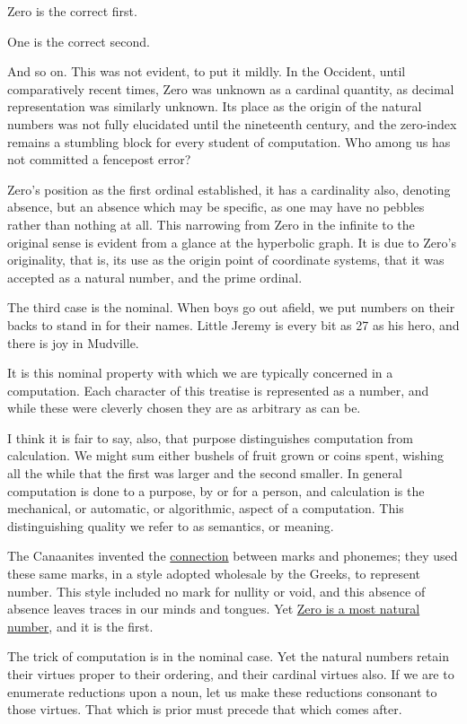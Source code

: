 \documentclass[twoside]{article}
\begin{document}
Zero is the correct first.

One is the correct second.

And so on. This was not evident, to put it mildly. In the Occident, until comparatively recent times, Zero was unknown as a cardinal quantity, as decimal representation was similarly unknown. Its place as the origin of the natural numbers was not fully elucidated until the nineteenth century, and the zero-index remains a stumbling block for every student of computation. Who among us has not committed a fencepost error?

Zero's position as the first ordinal established, it has a cardinality also, denoting absence, but an absence which may be specific, as one may have no pebbles rather than nothing at all. This narrowing from Zero in the infinite to the original sense is evident from a glance at the hyperbolic graph. It is due to Zero's originality, that is, its use as the origin point of coordinate systems, that it was accepted as a natural number, and the prime ordinal.

The third case is the nominal. When boys go out afield, we put numbers on their backs to stand in for their names. Little Jeremy is every bit as 27 as his hero, and there is joy in Mudville.

It is this nominal property with which we are typically concerned in a computation. Each character of this treatise is represented as a number, and while these were cleverly chosen they are as arbitrary as can be.

I think it is fair to say, also, that purpose distinguishes computation from calculation. We might sum either bushels of fruit grown or coins spent, wishing all the while that the first was larger and the second smaller. In general computation is done to a purpose, by or for a person, and calculation is the mechanical, or automatic, or algorithmic, aspect of a computation. This distinguishing quality we refer to as semantics, or meaning.

The Canaanites invented the \href{https://en.wikipedia.org/wiki/Alphabet}{connection} between marks and phonemes; they used these same marks, in a style adopted wholesale by the Greeks, to represent number. This style included no mark for nullity or void, and this absence of absence leaves traces in our minds and tongues. Yet \href{https://www.cs.utexas.edu/users/EWD/transcriptions/EWD08xx/EWD831.html}{Zero is a most natural number}, and it is the first.

The trick of computation is in the nominal case. Yet the natural numbers retain their virtues proper to their ordering, and their cardinal virtues also. If we are to enumerate reductions upon a noun, let us make these reductions consonant to those virtues. That which is prior must precede that which comes after.
\end{document}
